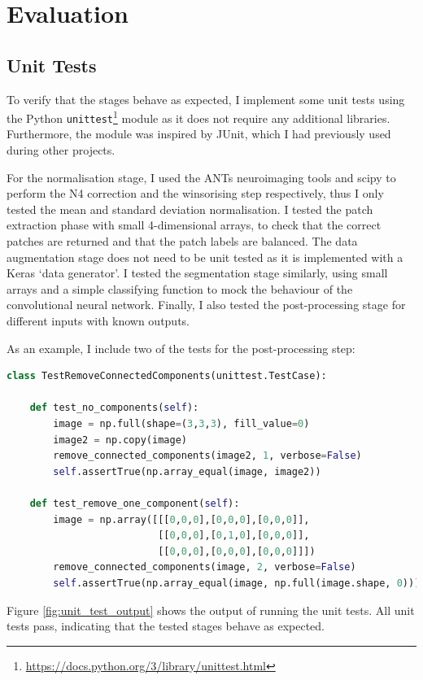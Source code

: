 \documentclass[12pt,a4paper,twoside,openright]{report}
\begin{document}
\chapter{Evaluation}

\section{Unit Tests}
To verify that the stages behave as expected, I implement some unit tests using the Python \texttt{unittest}\footnote{\url{https://docs.python.org/3/library/unittest.html}} module as it does not require any additional libraries. Furthermore, the module was inspired by JUnit, which I had previously used during other projects.

 For the normalisation stage, I used the ANTs neuroimaging tools and scipy to perform the N4 correction and the winsorising step respectively, thus I only tested the mean and standard deviation normalisation. I tested the patch extraction phase with small 4-dimensional arrays, to check that the correct patches are returned and that the patch labels are balanced. The data augmentation stage does not need to be unit tested as it is implemented with a Keras `data generator'. I tested the segmentation stage similarly, using small arrays and a simple classifying function to mock the behaviour of the convolutional neural network. Finally, I also tested the post-processing stage for different inputs with known outputs.
 
As an example, I include two of the tests for the post-processing step:
\begin{lstlisting}[language=Python]
	class TestRemoveConnectedComponents(unittest.TestCase):

    def test_no_components(self):
        image = np.full(shape=(3,3,3), fill_value=0)
        image2 = np.copy(image)
        remove_connected_components(image2, 1, verbose=False)
        self.assertTrue(np.array_equal(image, image2))
    
    def test_remove_one_component(self):
        image = np.array([[[0,0,0],[0,0,0],[0,0,0]],
                          [[0,0,0],[0,1,0],[0,0,0]],
                          [[0,0,0],[0,0,0],[0,0,0]]])
        remove_connected_components(image, 2, verbose=False)
        self.assertTrue(np.array_equal(image, np.full(image.shape, 0)))
\end{lstlisting}

Figure \ref{fig:unit_test_output} shows the output of running the unit tests. All unit tests pass, indicating that the tested stages behave as expected.
\end{document}
